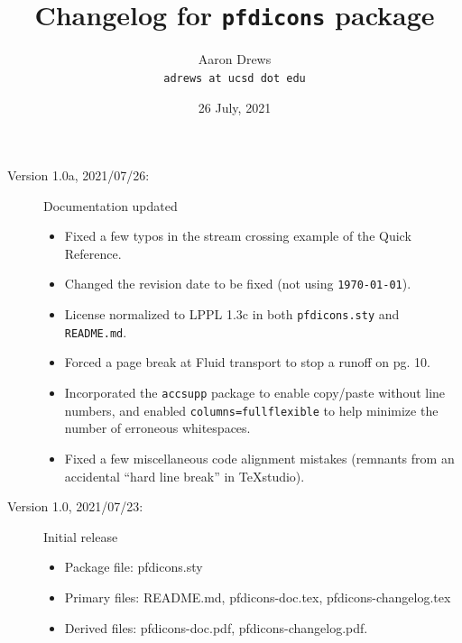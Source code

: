 \documentclass{article}
\title{Changelog for \texttt{pfdicons} package}
\author{Aaron Drews\\\texttt{adrews at ucsd dot edu}}
\date{26 July, 2021}
\begin{document}
	\maketitle
	
	\begin{description}
	\item[Version 1.0a, 2021/07/26:] Documentation updated
	\begin{itemize}
		\item Fixed a few typos in the stream crossing example of the Quick Reference.
		\item Changed the revision date to be fixed (not using \texttt{\today}).
		\item License normalized to LPPL 1.3c in both \texttt{pfdicons.sty} and \texttt{README.md}.
		\item Forced a page break at Fluid transport to stop a runoff on pg. 10.
		\item Incorporated the \texttt{accsupp} package to enable copy/paste without line numbers, and enabled \texttt{columns=fullflexible} to help minimize the number of erroneous whitespaces.
		\item Fixed a few miscellaneous code alignment mistakes (remnants from an accidental ``hard line break'' in TeXstudio).
	\end{itemize}
		
	\item[Version 1.0, 2021/07/23:] Initial release
		
	\begin{itemize}
		\item Package file: pfdicons.sty
		\item Primary files: README.md, pfdicons-doc.tex, pfdicons-changelog.tex
		\item Derived files: pfdicons-doc.pdf, pfdicons-changelog.pdf.
	\end{itemize}
		
	\end{description}	
\end{document}
